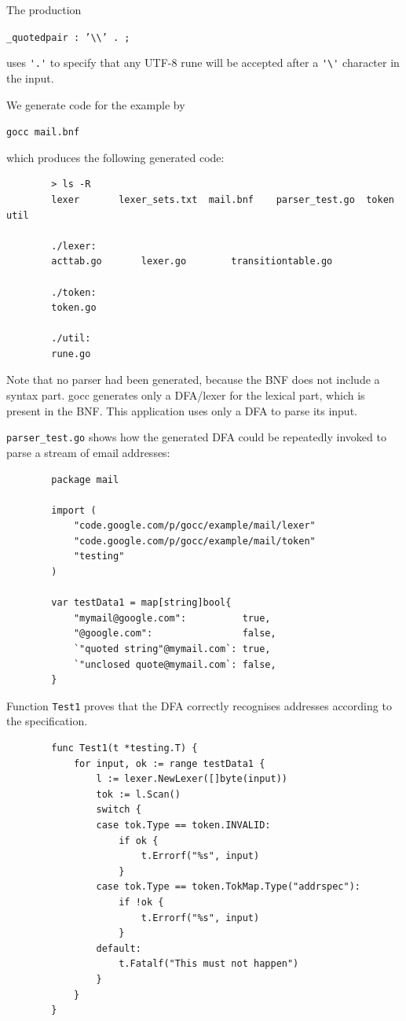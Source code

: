 \documentclass[12pt]{article}
\begin{document}
	The production 

	\verb|_quotedpair : ’\\’ . ;|

	uses \verb|'.'| to specify that any UTF-8 rune will be accepted after a \verb|'\'| character in the input.

	We generate code for the example by

	\verb|gocc mail.bnf|

	which produces the following generated code:

	\begin{verbatim}
		> ls -R
		lexer		lexer_sets.txt	mail.bnf	parser_test.go	token		util

		./lexer:
		acttab.go		lexer.go		transitiontable.go

		./token:
		token.go

		./util:
		rune.go
	\end{verbatim}

	Note that no parser had been generated, because the BNF does not include a syntax part. gocc generates only a DFA/lexer for the lexical part, which is present in the BNF. This application uses only a DFA to parse its input.

	\verb|parser_test.go| shows how the generated DFA could be repeatedly invoked to parse a stream of email addresses:

	\begin{verbatim}
		package mail

		import (
		    "code.google.com/p/gocc/example/mail/lexer"
		    "code.google.com/p/gocc/example/mail/token"
		    "testing"
		)

		var testData1 = map[string]bool{
		    "mymail@google.com":          true,
		    "@google.com":                false,
		    `"quoted string"@mymail.com`: true,
		    `"unclosed quote@mymail.com`: false,
		}
	\end{verbatim}

	Function \verb|Test1| proves that the DFA correctly recognises addresses according to the specification.

	\begin{verbatim}
		func Test1(t *testing.T) {
		    for input, ok := range testData1 {
		        l := lexer.NewLexer([]byte(input))
		        tok := l.Scan()
		        switch {
		        case tok.Type == token.INVALID:
		            if ok {
		                t.Errorf("%s", input)
		            }
		        case tok.Type == token.TokMap.Type("addrspec"):
		            if !ok {
		                t.Errorf("%s", input)
		            }
		        default:
		            t.Fatalf("This must not happen")
		        }
		    }
		}

	\end{verbatim}
\end{document}
